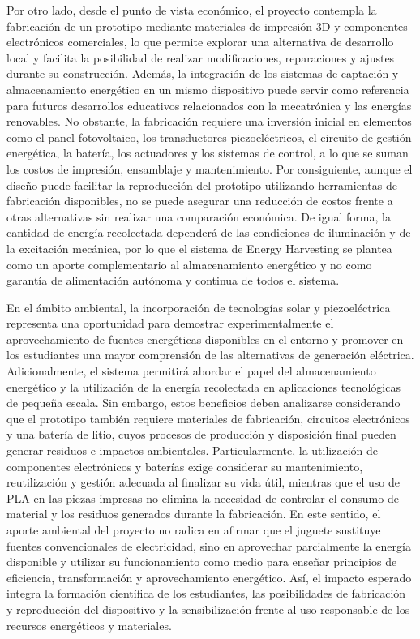 \documentclass[11pt]{article}
\begin{document}
Por otro lado, desde el punto de vista económico, el proyecto contempla la fabricación de un prototipo mediante materiales de impresión 3D y componentes electrónicos comerciales, lo que permite explorar una alternativa de desarrollo local y facilita la posibilidad de realizar modificaciones, reparaciones y ajustes durante su construcción. Además, la integración de los sistemas de captación y almacenamiento energético en un mismo dispositivo puede servir como referencia para futuros desarrollos educativos relacionados con la mecatrónica y las energías renovables. No obstante, la fabricación requiere una inversión inicial en elementos como el panel fotovoltaico, los transductores piezoeléctricos, el circuito de gestión energética, la batería, los actuadores y los sistemas de control, a lo que se suman los costos de impresión, ensamblaje y mantenimiento. Por consiguiente, aunque el diseño puede facilitar la reproducción del prototipo utilizando herramientas de fabricación disponibles, no se puede asegurar una reducción de costos frente a otras alternativas sin realizar una comparación económica. De igual forma, la cantidad de energía recolectada dependerá de las condiciones de iluminación y de la excitación mecánica, por lo que el sistema de Energy Harvesting se plantea como un aporte complementario al almacenamiento energético y no como garantía de alimentación autónoma y continua de todos el sistema.

En el ámbito ambiental, la incorporación de tecnologías solar y piezoeléctrica representa una oportunidad para demostrar experimentalmente el aprovechamiento de fuentes energéticas disponibles en el entorno y promover en los estudiantes una mayor comprensión de las alternativas de generación eléctrica. Adicionalmente, el sistema permitirá abordar el papel del almacenamiento energético y la utilización de la energía recolectada en aplicaciones tecnológicas de pequeña escala. Sin embargo, estos beneficios deben analizarse considerando que el prototipo también requiere materiales de fabricación, circuitos electrónicos y una batería de litio, cuyos procesos de producción y disposición final pueden generar residuos e impactos ambientales. Particularmente, la utilización de componentes electrónicos y baterías exige considerar su mantenimiento, reutilización y gestión adecuada al finalizar su vida útil, mientras que el uso de PLA en las piezas impresas no elimina la necesidad de controlar el consumo de material y los residuos generados durante la fabricación. En este sentido, el aporte ambiental del proyecto no radica en afirmar que el juguete sustituye fuentes convencionales de electricidad, sino en aprovechar parcialmente la energía disponible y utilizar su funcionamiento como medio para enseñar principios de eficiencia, transformación y aprovechamiento energético. Así, el impacto esperado integra la formación científica de los estudiantes, las posibilidades de fabricación y reproducción del dispositivo y la sensibilización frente al uso responsable de los recursos energéticos y materiales.
\end{document}
